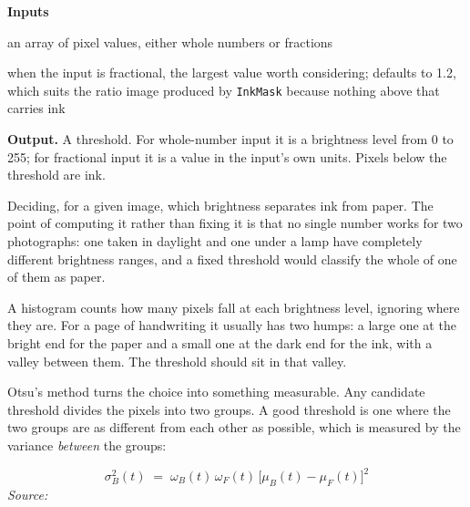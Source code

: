 \noindent\textbf{Inputs}
\begin{description}[leftmargin=2.2em,style=nextline,font=\normalfont\ttfamily]\setlength\itemsep{1pt}
  \item[{v}] \normalfont an array of pixel values, either whole numbers or fractions
  \item[{hi}] \normalfont when the input is fractional, the largest value worth considering; defaults to 1.2, which suits the ratio image produced by \texttt{InkMask} because nothing above that carries ink
\end{description}

\noindent\textbf{Output.} A threshold. For whole-number input it is a brightness level from 0 to 255; for fractional input it is a value in the input's own units. Pixels below the threshold are ink.


Deciding, for a given image, which brightness separates ink from paper. The point of computing it rather than fixing it is that no single number works for two photographs: one taken in daylight and one under a lamp have completely different brightness ranges, and a fixed threshold would classify the whole of one of them as paper.


A histogram counts how many pixels fall at each brightness level, ignoring where they are. For a page of handwriting it usually has two humps: a large one at the bright end for the paper and a small one at the dark end for the ink, with a valley between them. The threshold should sit in that valley.


Otsu's method \cite{otsu1979} turns the choice into something measurable. Any candidate threshold divides the pixels into two groups. A good threshold is one where the two groups are as different from each other as possible, which is measured by the variance \emph{between} the groups:


\begin{equation}
\sigma_B^2(t) \;=\; \omega_B(t)\,\omega_F(t)\,\big[\mu_B(t) - \mu_F(t)\big]^2
\end{equation}
\noindent\emph{Source: }\cite{otsu1979}


